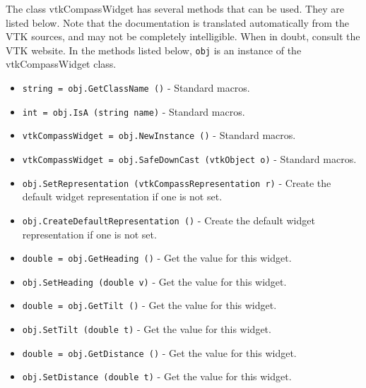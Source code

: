 The class vtkCompassWidget has several methods that can be used.
  They are listed below.
Note that the documentation is translated automatically from the VTK sources,
and may not be completely intelligible.  When in doubt, consult the VTK website.
In the methods listed below, \verb|obj| is an instance of the vtkCompassWidget class.
\begin{itemize}
\item  \verb|string = obj.GetClassName ()| -  Standard macros.

\item  \verb|int = obj.IsA (string name)| -  Standard macros.

\item  \verb|vtkCompassWidget = obj.NewInstance ()| -  Standard macros.

\item  \verb|vtkCompassWidget = obj.SafeDownCast (vtkObject o)| -  Standard macros.

\item  \verb|obj.SetRepresentation (vtkCompassRepresentation r)| -  Create the default widget representation if one is not set. 

\item  \verb|obj.CreateDefaultRepresentation ()| -  Create the default widget representation if one is not set. 

\item  \verb|double = obj.GetHeading ()| -  Get the value for this widget. 

\item  \verb|obj.SetHeading (double v)| -  Get the value for this widget. 

\item  \verb|double = obj.GetTilt ()| -  Get the value for this widget. 

\item  \verb|obj.SetTilt (double t)| -  Get the value for this widget. 

\item  \verb|double = obj.GetDistance ()| -  Get the value for this widget. 

\item  \verb|obj.SetDistance (double t)| -  Get the value for this widget. 

\end{itemize}
